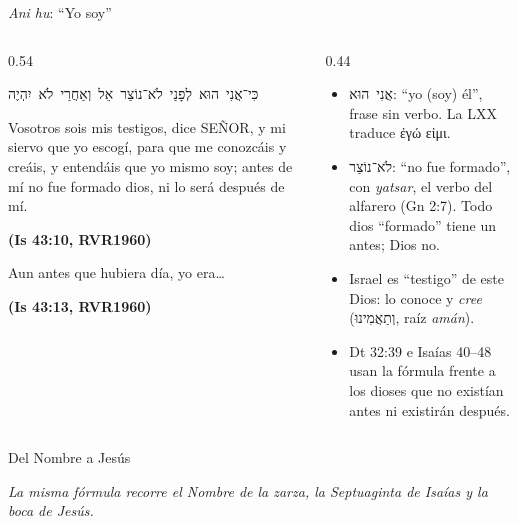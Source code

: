 \documentclass[hyperref={bookmarks=false},aspectratio=169]{beamer}
\newcommand{\heb}[1]{\mbox{\foreignlanguage{hebrew}{#1}}}
\newcommand{\grc}[1]{\foreignlanguage{ancientgreek}{#1}}
\newcommand{\SENOR}{S{\fontsize{0.78em}{1em}\selectfont EÑOR}}
\newcommand{\fuente}[1]{\par\hfill{\upshape\bfseries\footnotesize\textcolor{azul}{#1}}}
\begin{document}
\begin{frame}{\emph{Ani hu}: ``Yo soy''}
\begin{columns}[t,onlytextwidth]
\begin{column}{0.54\textwidth}
\begin{center}\heb{כִּי־אֲנִי הוּא לְפָנַי לֹא־נוֹצַר אֵל וְאַחֲרַי לֹא יִהְיֶה}\end{center}
\begin{cita}Vosotros sois mis testigos, dice \SENOR, y mi siervo que yo escogí, para que me conozcáis y creáis, y entendáis que yo mismo soy; antes de mí no fue formado dios, ni lo será después de mí.\fuente{(Is 43:10, RVR1960)}\end{cita}
\begin{cita}Aun antes que hubiera día, yo era\ldots\fuente{(Is 43:13, RVR1960)}\end{cita}
\end{column}
\begin{column}{0.44\textwidth}\scriptsize
\begin{itemize}
\item \heb{אֲנִי הוּא}: ``yo (soy) él'', frase sin verbo. La LXX traduce \grc{ἐγώ εἰμι}.
\item \heb{לֹא־נוֹצַר}: ``no fue formado'', con \emph{yatsar}, el verbo del alfarero (Gn 2:7). Todo dios ``formado'' tiene un antes; Dios no.
\item Israel es ``testigo'' de este Dios: lo conoce y \emph{cree} (\heb{וְתַאֲמִינוּ}, raíz \emph{amán}).
\item Dt 32:39 e Isaías 40--48 usan la fórmula frente a los dioses que no existían antes ni existirán después.
\end{itemize}
\end{column}
\end{columns}
\end{frame}

\begin{frame}{Del Nombre a Jesús}
\centering
{}\par\medskip
{\scriptsize\itshape\color{gris} La misma fórmula recorre el Nombre de la zarza, la Septuaginta de Isaías y la boca de Jesús.}
\end{frame}
\end{document}
